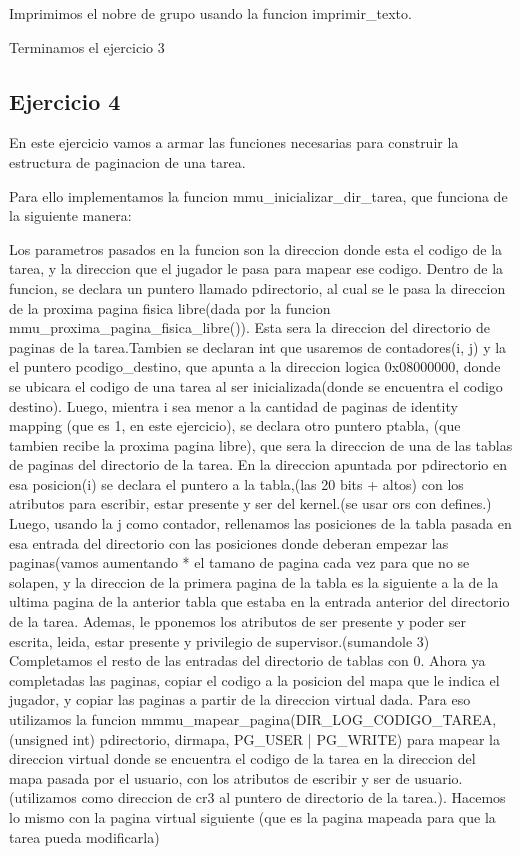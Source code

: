 \documentclass[a4paper]{article}
\begin{document}
	Imprimimos el nobre de grupo usando la funcion imprimir_texto.
	 
	Terminamos el ejercicio 3
\newpage

\subsection{Ejercicio 4}

En este ejercicio vamos a armar  las funciones necesarias para construir la estructura de paginacion de una tarea.

Para ello implementamos la funcion mmu_inicializar_dir_tarea, que funciona de la siguiente manera:

Los parametros pasados en la funcion son la direccion donde esta el codigo de la tarea, y la direccion que el jugador le pasa para mapear ese codigo.
Dentro de la funcion, se declara un puntero llamado pdirectorio, al cual se le pasa la direccion de la proxima pagina fisica libre(dada por la funcion mmu_proxima_pagina_fisica_libre()). Esta sera la direccion del directorio de paginas de la tarea.Tambien se declaran int que usaremos de contadores(i, j) y la el puntero pcodigo_destino, que apunta a la direccion logica 0x08000000, donde se ubicara el codigo de una tarea al ser inicializada(donde se encuentra el codigo destino).
Luego, mientra i sea menor a la cantidad de paginas de identity mapping (que es 1, en este ejercicio), se declara  otro puntero ptabla, (que tambien recibe la proxima pagina libre), que sera la direccion de una de las tablas de paginas del directorio de la tarea. En la direccion apuntada por pdirectorio en esa posicion(i) se declara el puntero a la tabla,(las 20 bits + altos) con los atributos para escribir, estar presente y ser del kernel.(se usar ors con defines.)
Luego,  usando la j como contador, rellenamos las posiciones de la tabla pasada en esa entrada del directorio con las posiciones donde deberan empezar las paginas(vamos aumentando * el tamano de pagina cada vez para que no se solapen, y la direccion de la primera pagina de la tabla es la siguiente a la de la ultima pagina de la anterior tabla que estaba en la entrada anterior del directorio de la tarea. Ademas, le pponemos los atributos de ser presente y poder ser escrita, leida,  estar presente y privilegio de supervisor.(sumandole 3)
Completamos el resto de las entradas del directorio de tablas con 0. 
Ahora ya completadas las paginas,  copiar el codigo a la posicion del mapa que le indica el jugador, y copiar las paginas a partir de la direccion virtual dada.
 Para eso utilizamos la funcion mmmu_mapear_pagina(DIR_LOG_CODIGO_TAREA, (unsigned int) pdirectorio, dirmapa, PG_USER | PG_WRITE) para mapear la direccion virtual donde se encuentra el codigo de la tarea en la direccion del mapa pasada por el usuario, con los atributos de escribir y ser de usuario. (utilizamos como direccion de cr3 al puntero de directorio de la tarea.). Hacemos lo mismo con la pagina virtual siguiente (que es la pagina mapeada para  que la tarea pueda modificarla)
\end{document}
